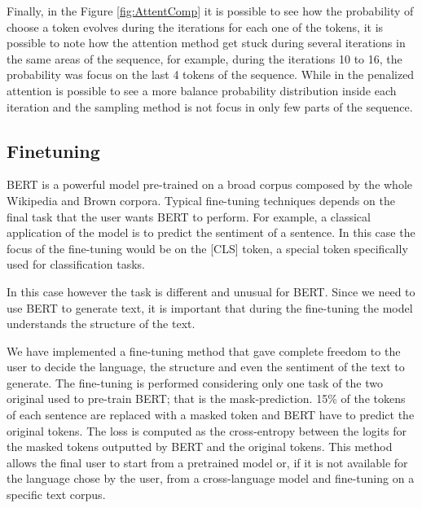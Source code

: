 \documentclass[10pt,twocolumn,letterpaper]{article}
\begin{document}
Finally, in the Figure \ref{fig:AttentComp} it is possible to see how the probability of choose a token evolves
during the iterations for each one of the tokens, it is possible to note how the attention method
get stuck during several iterations in the same areas of the sequence, for example, during the iterations
10 to 16, the probability was focus on the last 4 tokens of the sequence.
While in the penalized attention is possible to see a more balance probability distribution inside each iteration
and the sampling method is not focus in only few parts of the sequence.

\subsection{Finetuning}
BERT is a powerful model pre-trained on a broad corpus composed by the whole
Wikipedia and Brown corpora.
Typical fine-tuning techniques depends on the final task that the user wants BERT to perform.
For example, a classical application of the model is to predict the sentiment of a sentence.
In this case the focus of the fine-tuning would be on the [CLS] token,
a special token specifically used for classification tasks.

In this case however the task is different and unusual for BERT.
Since we need to use BERT to generate text, it is important that during the
fine-tuning the model understands the structure of the text.

We have implemented a fine-tuning method that gave complete freedom to the user to decide the language,
the structure and even the sentiment of the text to generate.
The fine-tuning is performed considering only one task of the
two original used to pre-train BERT; that is the mask-prediction.
15\% of the tokens of each sentence are replaced with a masked token and
BERT have to predict the original tokens.
The loss is computed as the cross-entropy between the logits for the
masked tokens outputted by BERT and the original tokens.
This method allows the final user to start from a pretrained model or, if
it is not available for the language chose by the user, from a cross-language model
and fine-tuning on a specific text corpus.
\end{document}
